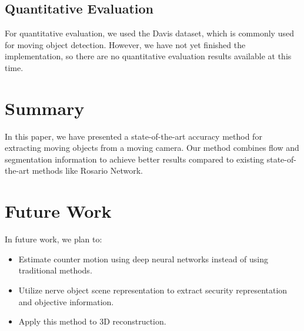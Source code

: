 \documentclass[10pt, twocolumn]{article}
\begin{document}
\subsection{Quantitative Evaluation}
For quantitative evaluation, we used the Davis dataset, which is commonly used for moving object detection. However, we have not yet finished the implementation, so there are no quantitative evaluation results available at this time.

\section{Summary}
In this paper, we have presented a state-of-the-art accuracy method for extracting moving objects from a moving camera. Our method combines flow and segmentation information to achieve better results compared to existing state-of-the-art methods like Rosario Network.

\section{Future Work}
In future work, we plan to:

\begin{itemize}
  \item Estimate counter motion using deep neural networks instead of using traditional methods.
  \item Utilize nerve object scene representation to extract security representation and objective information.
  \item Apply this method to 3D reconstruction.
\end{itemize}



\end{document}
